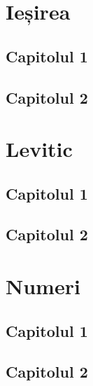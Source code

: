 \documentclass[12pt,a4paper]{article}
\begin{document}
\section{Ieșirea}

\subsection{Capitolul 1}

\subsection{Capitolul 2}


\section{Levitic}

\subsection{Capitolul 1}

\subsection{Capitolul 2}


\section{Numeri}

\subsection{Capitolul 1}

\subsection{Capitolul 2}
\end{document}
